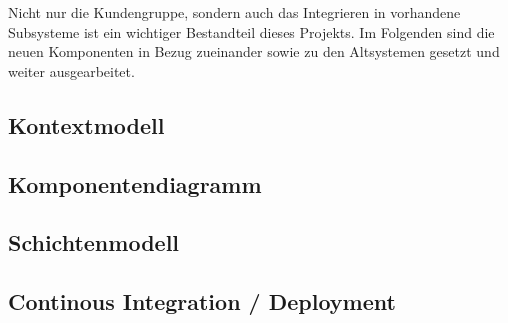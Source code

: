 Nicht nur die Kundengruppe, sondern auch das Integrieren in vorhandene Subsysteme ist ein wichtiger Bestandteil dieses Projekts. Im Folgenden sind die neuen Komponenten in Bezug zueinander sowie zu den Altsystemen gesetzt und weiter ausgearbeitet.

\subsection{Kontextmodell}\label{subsec:kontextmodell}
    


\subsection{Komponentendiagramm}\label{subsec:komponentendiagramm}
    


\subsection{Schichtenmodell}\label{subsec:schichtenmodell}
    


\subsection{Continous Integration / Deployment}\label{subsec:continous-integration-and-deployment}
    